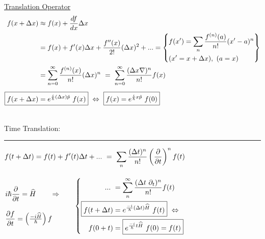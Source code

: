 \documentclass[12pt]{article}
\begin{document}
\newpage \noindent
\underline{Translation Operator}\\[5pt]
\begin{align*}
    f(x + \Delta x) &\approx f(x) + \frac{df}{dx} \Delta x \\
    &= f(x) + f'(x) \Delta x + \frac{f''(x)}{2!} (\Delta x)^2 + ... 
        = \left\{ \begin{aligned}
            &f(x') = \sum_{n} \frac{ f^{(n)}(a) }{n!} (x'-a)^n \\
            &(x' = x + \Delta x), \ (a = x)
        \end{aligned} \right\} \\
    &= \sum_{n=0}^\infty \frac{ f^{(n)}(x) }{n!} (\Delta x)^n 
        \ = \ \sum_{n=0}^\infty \frac{ (\Delta x \nabla)^n }{n!} f(x) \\[5pt]
    \Aboxed{ f(x + \Delta x) &= e^{\frac{i}{\hbar} (\Delta x) \hat{p}} \ f(x) }
    \ \Leftrightarrow \ \boxed{ f(x) = e^{\frac{i}{\hbar} x \hat{p}} \ f(0) }
\end{align*}

\hfill \break \\
Time Translation: \indent 
\rule[-60pt]{.5pt}{120pt} \indent
\( \begin{gathered}
    \displaystyle f(t + \Delta t) = f(t) + f'(t) \Delta t + ... 
        \ = \ \sum_n \frac{ (\Delta t)^n }{n!} 
        \left( \frac{\partial}{\partial t} \right)^n f(t) \\[10pt]
    \begin{aligned}
        &i\hbar \frac{\partial}{\partial t} = \widehat{H} 
            \hspace{20pt} \Rightarrow \hspace{20pt} \\[10pt]
        &\frac{\partial f}{\partial t} = \left( \tfrac{- i \widehat{H}}{\hbar} \right) f
    \end{aligned}
    \left\{ \begin{aligned}
        ... \ &= \sum_n^\infty \frac{ (\Delta t \ \partial_t)^n }{n!} f(t) \\
        \Aboxed{ f(t + \Delta t) &= e^{\frac{-i}{\hbar} (\Delta t) \widehat{H}} \ f(t) } \ \Leftrightarrow\\
        f(0 + t) &= \boxed{ e^{\frac{-i}{\hbar} t \widehat{H}} \ f(0) = f(t) }
    \end{aligned} \right.
\end{gathered} \)
\end{document}

